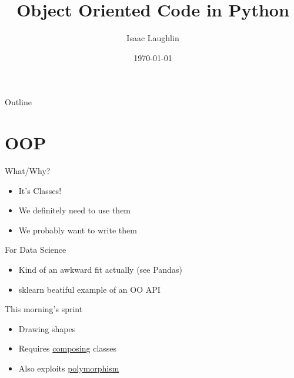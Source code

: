 \documentclass[presentation]{beamer}
\author{Isaac Laughlin}
\date{\today}
\title{Object Oriented Code in Python}
\begin{document}
\maketitle
\begin{frame}{Outline}
\tableofcontents
\end{frame}


\section{OOP}
\label{sec-1}
\begin{frame}[label=sec-1-1]{What/Why?}
\begin{itemize}
\item It's Classes!
\item We definitely need to use them
\item We probably want to write them
\end{itemize}
\end{frame}
\begin{frame}[label=sec-1-2]{For Data Science}
\begin{itemize}
\item Kind of an awkward fit actually (see Pandas)
\item sklearn beatiful example of an OO API
\end{itemize}
\end{frame}
\begin{frame}[label=sec-1-3]{This morning's sprint}
\begin{itemize}
\item Drawing shapes
\item Requires \uline{composing} classes
\item Also exploits \uline{polymorphism}
\end{itemize}
\end{frame}
\end{document}
